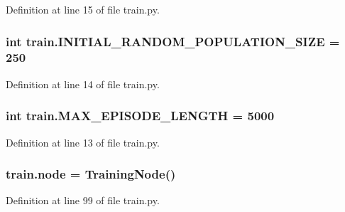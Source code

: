 Definition at line 15 of file train.\+py.

\subsubsection[{\texorpdfstring{I\+N\+I\+T\+I\+A\+L\+\_\+\+R\+A\+N\+D\+O\+M\+\_\+\+P\+O\+P\+U\+L\+A\+T\+I\+O\+N\+\_\+\+S\+I\+ZE}{INITIAL_RANDOM_POPULATION_SIZE}}]{\setlength{\rightskip}{0pt plus 5cm}int train.\+I\+N\+I\+T\+I\+A\+L\+\_\+\+R\+A\+N\+D\+O\+M\+\_\+\+P\+O\+P\+U\+L\+A\+T\+I\+O\+N\+\_\+\+S\+I\+ZE = 250}\hypertarget{namespacetrain_a4e23f5a2db715f6c10039c5ab27d4f44}{}\label{namespacetrain_a4e23f5a2db715f6c10039c5ab27d4f44}


Definition at line 14 of file train.\+py.

\subsubsection[{\texorpdfstring{M\+A\+X\+\_\+\+E\+P\+I\+S\+O\+D\+E\+\_\+\+L\+E\+N\+G\+TH}{MAX_EPISODE_LENGTH}}]{\setlength{\rightskip}{0pt plus 5cm}int train.\+M\+A\+X\+\_\+\+E\+P\+I\+S\+O\+D\+E\+\_\+\+L\+E\+N\+G\+TH = 5000}\hypertarget{namespacetrain_ad27ad66c4ffaa353cbb94c83a7968ce9}{}\label{namespacetrain_ad27ad66c4ffaa353cbb94c83a7968ce9}


Definition at line 13 of file train.\+py.

\subsubsection[{\texorpdfstring{node}{node}}]{\setlength{\rightskip}{0pt plus 5cm}train.\+node = {\bf Training\+Node}()}\hypertarget{namespacetrain_a7c68a6981d3c74c76920e856fc7c2419}{}\label{namespacetrain_a7c68a6981d3c74c76920e856fc7c2419}


Definition at line 99 of file train.\+py.

